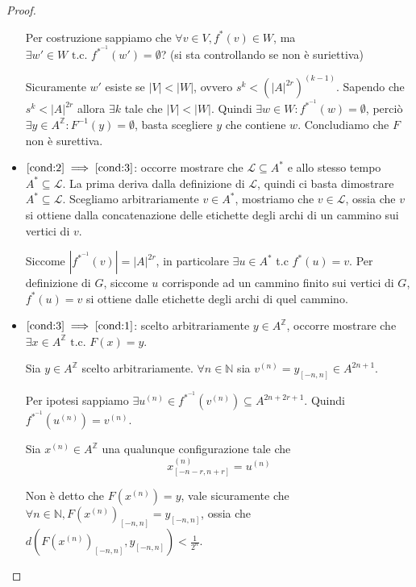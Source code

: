 \begin{teorema}
\begin{proof}
\begin{itemize}
                  Per costruzione sappiamo che $\forall v\in V, f^{\ast}(v)\in W$, ma $\exists
                      w'\in W\text{ t.c. } f^{\ast^{-1}} (w')= \emptyset$? (si sta controllando se non è suriettiva)

                  Sicuramente $w'$ esiste se $|V|<|W|$, ovvero  $s^k<(|A|^{2r})^{(k-1)}$.
                  Sapendo che $s^k < |A|^{2r}$ allora $\exists k$ tale che  $|V|<|W|$.
                  Quindi $\exists w \in W: f^{\ast^{-1}} (w) =\emptyset$, perciò
                  $\exists y \in A^{\mathbb{Z}}: F^{-1}(y) = \emptyset$, basta scegliere
                  $y$ che contiene $w$. Concludiamo che $F$ non è surettiva.

            \item $\ref{cond:2}\implies \ref{cond:3}$: occorre mostrare che $\mathcal{L} \subseteq A^\ast$
                  e allo stesso tempo $ A^\ast \subseteq\mathcal{L}$. La prima deriva
                  dalla definizione di $\mathcal{L}$, quindi ci basta dimostrare
                  $A^\ast \subseteq\mathcal{L}$. Scegliamo arbitrariamente $v\in  A^\ast$,
                  mostriamo che $v\in \mathcal{L}$, ossia che $v$ si ottiene dalla concatenazione
                  delle etichette degli archi di un cammino sui vertici di $v$.

                  Siccome $|f^{\ast^{-1}}(v)| = |A|^{2r}$, in particolare $\exists u \in A^\ast$
                  t.c $f^\ast(u) = v$. Per definizione di $G$, siccome $u$ corrisponde
                  ad un cammino finito sui vertici di $G$, $f^\ast(u)=v$ si ottiene dalle etichette
                  degli archi di quel cammino.
            \item $\ref{cond:3}\implies \ref{cond:1}$: scelto arbitrariamente $y\in A^\mathbb{Z}$,
                  occorre mostrare che $\exists x\in A^\mathbb{Z} \text{ t.c. } F(x) =y$.

                  Sia $y\in A^\mathbb{Z}$ scelto arbitrariamente. $\forall n\in \mathbb{N}$
                  sia $v^{(n)} = y_{[-n,n]}\in A^{2n+1}$.

                  Per ipotesi sappiamo $\exists u^{(n)}\in f^{\ast^{-1}}(v^{(n)})\subseteq A^{2n+2r+1}$.
                  Quindi $f^{\ast^{-1}}(u^{(n)}) = v^{(n)}$.

                  Sia $x^{(n)}\in A^\mathbb{Z}$ una qualunque configurazione tale che
                  $$x^{(n)}_{[-n-r,n+r]} = u^{(n)}$$

                  Non è detto che $F(x^{(n)})=y$, vale sicuramente che $\forall n \in \mathbb{N},F(x^{(n)})_{[-n,n]}=y_{[-n,n]}$,
                  ossia che $d(F(x^{(n)})_{[-n,n]},y_{[-n,n]})< \frac{1}{2^n}$.


\end{itemize}
\end{proof}
\end{teorema}
